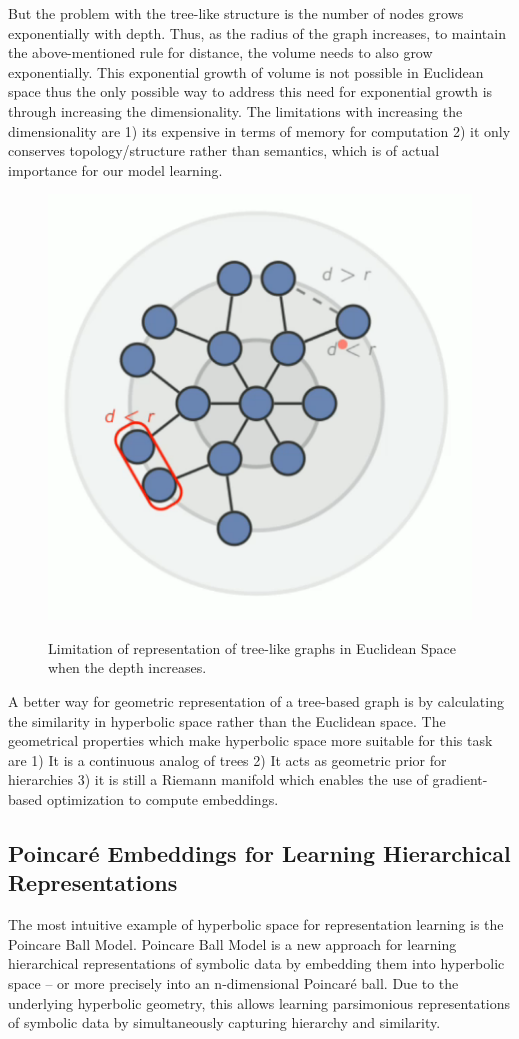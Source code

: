 But the problem with the tree-like structure is the number of nodes grows exponentially with depth. Thus, as the radius of the graph increases, to maintain the above-mentioned rule for distance, the volume needs to also grow exponentially. This exponential growth of volume is not possible in Euclidean space thus the only possible way to address this need for exponential growth is through increasing the dimensionality. The limitations with increasing the dimensionality are 1) its expensive in terms of memory for computation 2) it only conserves topology/structure rather than semantics, which is of actual importance for our model learning.
\begin{figure}
\centering
\includegraphics[width=0.5\linewidth]{lectures/11-a/tree_graphs_limitation.PNG}
\label{fig:tree_graphs_limitation}
\caption{Limitation of representation of tree-like graphs in Euclidean Space when the depth increases.}
\end{figure}


A better way for geometric representation of a tree-based graph is by calculating the similarity in hyperbolic space rather than the Euclidean space. The geometrical properties which make hyperbolic space more suitable for this task are 1) It is a continuous analog of trees 2) It acts as geometric prior for hierarchies 3) it is still a Riemann manifold which enables the use of gradient-based optimization to compute embeddings.

\subsection{Poincaré Embeddings for
Learning Hierarchical Representations}

The most intuitive example of hyperbolic space for representation learning is the Poincare Ball Model. Poincare Ball Model is a new approach for learning hierarchical representations of symbolic data by embedding them into hyperbolic space – or more precisely into an n-dimensional Poincaré ball. Due to the underlying hyperbolic geometry, this allows learning parsimonious representations of symbolic data by simultaneously capturing hierarchy and similarity.

